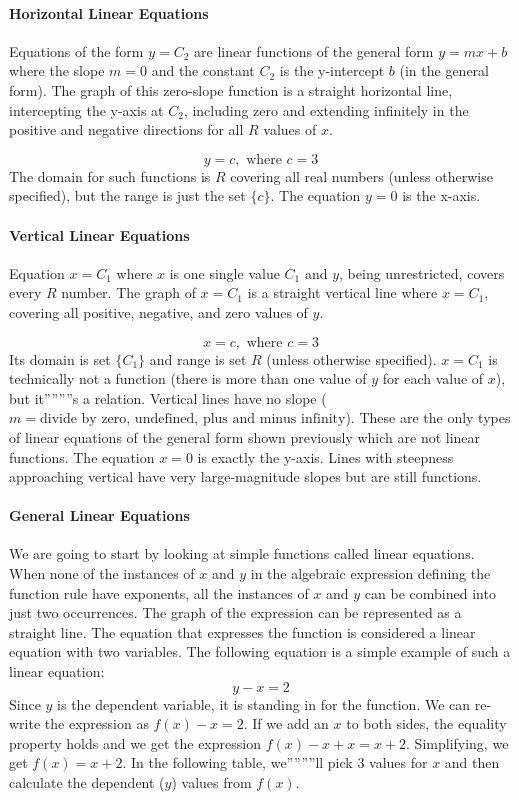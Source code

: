 \paragraph{Horizontal Linear Equations}

Equations of the form $y = C_2$ are linear functions of the general form $y = mx + b$ where the slope $m = 0$ and the constant $C_2$ is the y-intercept $b$ (in the general form). The graph of this zero-slope function is a straight horizontal line, intercepting the y-axis at $C_2$, including zero and extending infinitely in the positive and negative directions for all $R$ values of $x$.

$$
y = c, \text{ where } c = 3
$$
The domain for such functions is $R$ covering all real numbers (unless otherwise specified), but the range is just the set $\{ c \}$. The equation $y = 0$ is the x-axis.

\paragraph{Vertical Linear Equations}

Equation $x = C_1$ where $x$ is one single value $C_1$ and $y$, being unrestricted, covers every $R$ number. The graph of $x = C_1$ is a straight vertical line where $x = C_1$, covering all positive, negative, and zero values of $y$.

$$
x = c, \text{ where } c = 3
$$
Its domain is set $\{ C_1 \}$ and range is set $R$ (unless otherwise specified). $x = C_1$ is technically not a function (there is more than one value of $y$ for each value of $x$), but it''''''''s a relation. Vertical lines have no slope ($m = \text{divide by zero, undefined, plus and minus infinity}$). These are the only types of linear equations of the general form shown previously which are not linear functions. The equation $x = 0$ is exactly the y-axis. Lines with steepness approaching vertical have very large-magnitude slopes but are still functions.

\paragraph{General Linear Equations}

We are going to start by looking at simple functions called linear equations. When none of the instances of $x$ and $y$ in the algebraic expression defining the function rule have exponents, all the instances of $x$ and $y$ can be combined into just two occurrences. The graph of the expression can be represented as a straight line. The equation that expresses the function is considered a linear equation with two variables. The following equation is a simple example of such a linear equation:
$$
y - x = 2
$$
Since $y$ is the dependent variable, it is standing in for the function. We can re-write the expression as $f(x) - x = 2$. If we add an $x$ to both sides, the equality property holds and we get the expression $f(x) - x + x = x + 2$. Simplifying, we get $f(x) = x + 2$. In the following table, we''''''''ll pick 3 values for $x$ and then calculate the dependent ($y$) values from $f(x)$.

